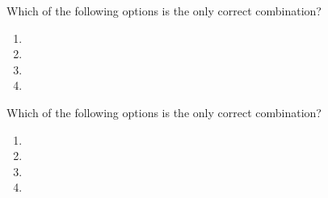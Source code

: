 \item Which of the following options is the only correct combination?
\begin{enumerate}
  \item {}
  \item {}
  \item {}
  \item {}
    
\end{enumerate}
    

\item Which of the following options is the only correct combination?
\begin{enumerate}
    \item {} 
    \item {}
    \item {}
    \item {}

\end{enumerate}

%





